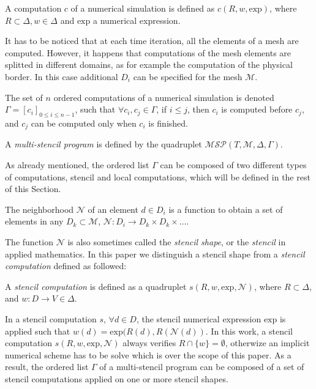 \begin{mydef}
A computation $c$ of a numerical simulation is defined as $c(R,w,\text{exp})$, where $R \subset \Delta, w \in \Delta$ and $\text{exp}$ a numerical expression. %
\end{mydef}
It has to be noticed that at each time iteration, all the elements of a mesh are computed. However, it happens that computations of the mesh elements are splitted in different domains, as for example the computation of the physical border. In this case additional $D_i$ can be specified for the mesh $\mathcal{M}$.

\begin{mydef}
The set of $n$ ordered computations of a numerical simulation is denoted $\Gamma = [c_i]_{0 \leq i \leq n-1}$, such that $\forall c_i,c_j \in \Gamma$, if $i \leq j$, then $c_i$ is computed before $c_j$, and $c_j$ can be computed only when $c_i$ is finished.
\end{mydef}

\begin{mydef}
A \textit{multi-stencil program} is defined by the quadruplet $\mathcal{MSP}(T,\mathcal{M},\Delta,\Gamma)$.
\end{mydef}

As already mentioned, the ordered list $\Gamma$ can be composed of two different types of computations, stencil and local computations, which will be defined in the rest of this Section.

\begin{mydef}
The neighborhood $\mathcal{N}$ of an element $d \in D_i$ is a function to obtain a set of elements in any $D_k \subset \mathcal{M}$, $\mathcal{N} : D_i \rightarrow D_k \times D_k \times \dots$.
\end{mydef}
The function $\mathcal{N}$ is also sometimes called the \textit{stencil shape}, or the \textit{stencil} in applied mathematics. In this paper we distinguish a stencil shape from a \textit{stencil computation} defined as followed:

\begin{mydef}
A \textit{stencil computation} is defined as a quadruplet $s(R,w,\text{exp},\mathcal{N})$, where $R \subset \Delta$, and $w : D \rightarrow V \in \Delta$.
\end{mydef}
In a stencil computation $s$, $\forall d \in D$, the stencil numerical expression $\text{exp}$ is applied such that $w(d) = \text{exp}(R(d),R(\mathcal{N}(d))$. In this work, a stencil computation $s(R,w,\text{exp},\mathcal{N})$ always verifies $R \cap \{w\} = \emptyset$, otherwize an implicit numerical scheme has to be solve which is over the scope of this paper. As a result, the ordered list $\Gamma$ of a multi-stencil program can be composed of a set of stencil computations applied on one or more stencil shapes.

